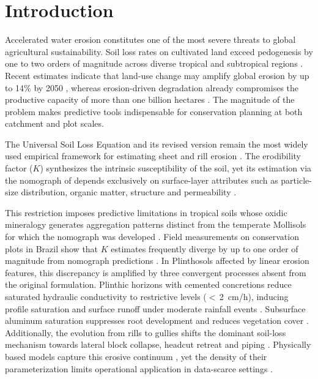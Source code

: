 \documentclass[preprint,review,12pt,authoryear]{elsarticle}
\begin{document}
\linenumbers

\section{Introduction}
\label{sec:intro}

Accelerated water erosion constitutes one of the most severe threats to global agricultural sustainability. Soil loss rates on cultivated land exceed pedogenesis by one to two orders of magnitude across diverse tropical and subtropical regions \citep{montgomery_2007}. Recent estimates indicate that land-use change may amplify global erosion by up to 14\% by 2050 \citep{borrelli_et_al_2017}, whereas erosion-driven degradation already compromises the productive capacity of more than one billion hectares \citep{lal_2001}. The magnitude of the problem makes predictive tools indispensable for conservation planning at both catchment and plot scales.

The Universal Soil Loss Equation and its revised version \citep{wischmeier_smith_1978,renard_et_al_1997} remain the most widely used empirical framework for estimating sheet and rill erosion \citep{alewell_et_al_2019}. The erodibility factor ($K$) synthesizes the intrinsic susceptibility of the soil, yet its estimation via the nomograph of \citet{wischmeier_et_al_1971} depends exclusively on surface-layer attributes such as particle-size distribution, organic matter, structure and permeability \citep{roemkens_et_al_1997}.

This restriction imposes predictive limitations in tropical soils whose oxidic mineralogy generates aggregation patterns distinct from the temperate Mollisols for which the nomograph was developed \citep{alewell_et_al_2019,cassol_et_al_2023}. Field measurements on conservation plots in Brazil show that $K$ estimates frequently diverge by up to one order of magnitude from nomograph predictions \citep{silva_et_al_2009,lafayette_cantalice_coutinho_2011}. In Plinthosols affected by linear erosion features, this discrepancy is amplified by three convergent processes absent from the original formulation. Plinthic horizons with cemented concretions reduce saturated hydraulic conductivity to restrictive levels ($<$\,2~cm/h), inducing profile saturation and surface runoff under moderate rainfall events \citep{wang_et_al_2020,embrapa_2018,horton_1933,bertoni_lombardi_neto_2017}. Subsurface aluminum saturation suppresses root development and reduces vegetation cover \citep{gura_et_al_2022}. Additionally, the evolution from rills to gullies shifts the dominant soil-loss mechanism towards lateral block collapse, headcut retreat and piping \citep{poesen_2018,poesen_et_al_2003,kirkby_bracken_2009,vanmaercke_et_al_2021}. Physically based models capture this erosive continuum \citep{nearing_et_al_1989,sidorchuk_2006}, yet the density of their parameterization limits operational application in data-scarce settings \citep{wilkinson_et_al_2024}.
\end{document}
